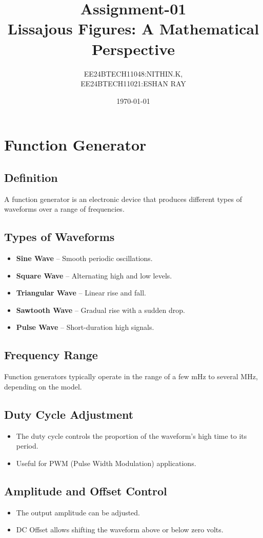 \documentclass{article}
\title{Assignment-01\\Lissajous Figures: A Mathematical Perspective}
\author{EE24BTECH11048:NITHIN.K,\\EE24BTECH11021:ESHAN RAY}
\date{\today}
\begin{document}
\maketitle
\section{Function Generator}

\subsection{Definition}
A function generator is an electronic device that produces different types of waveforms over a range of frequencies.

\subsection{Types of Waveforms}
\begin{itemize}
    \item \textbf{Sine Wave} – Smooth periodic oscillations.
    \item \textbf{Square Wave} – Alternating high and low levels.
    \item \textbf{Triangular Wave} – Linear rise and fall.
    \item \textbf{Sawtooth Wave} – Gradual rise with a sudden drop.
    \item \textbf{Pulse Wave} – Short-duration high signals.
\end{itemize}

\subsection{Frequency Range}
Function generators typically operate in the range of a few mHz to several MHz, depending on the model.

\subsection{Duty Cycle Adjustment}
\begin{itemize}
    \item The duty cycle controls the proportion of the waveform's high time to its period.
    \item Useful for PWM (Pulse Width Modulation) applications.
\end{itemize}

\subsection{Amplitude and Offset Control}
\begin{itemize}
    \item The output amplitude can be adjusted.
    \item DC Offset allows shifting the waveform above or below zero volts.
\end{itemize}
\end{document}
